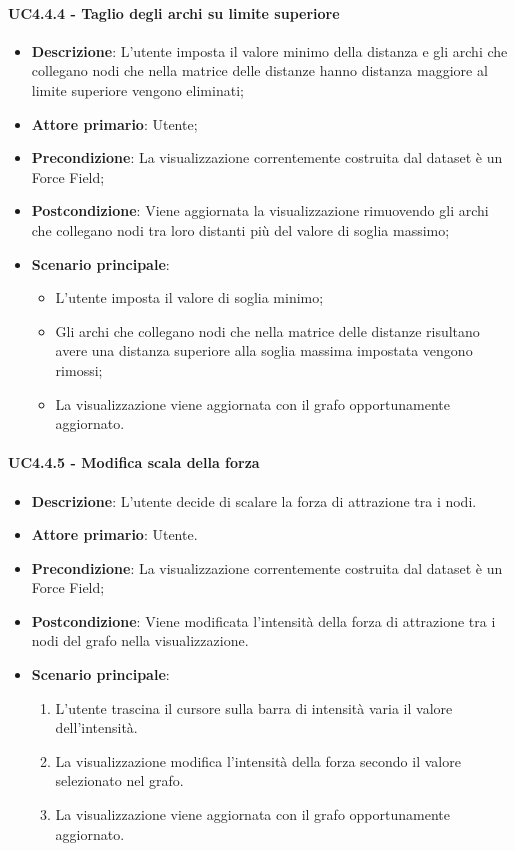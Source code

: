 \paragraph{UC4.4.4 - Taglio degli archi su limite superiore}
\label{par:uc4.4.4}
\begin{itemize}
    \item \textbf{Descrizione}:     L'utente imposta il valore minimo della distanza e gli archi che collegano nodi che nella matrice delle distanze hanno distanza maggiore al limite superiore vengono eliminati;
    \item \textbf{Attore primario}: Utente;
    \item \textbf{Precondizione}:   La visualizzazione correntemente costruita dal dataset è un Force Field;
    \item \textbf{Postcondizione}:  Viene aggiornata la visualizzazione rimuovendo gli archi  che collegano nodi tra loro distanti più del valore di soglia massimo;
    \item \textbf{Scenario principale}:
    \begin{itemize}
        \item L'utente imposta il valore di soglia minimo;
        \item Gli archi che collegano nodi che nella matrice delle distanze risultano avere una distanza superiore alla soglia massima impostata vengono rimossi;
        \item La visualizzazione viene aggiornata con il grafo opportunamente aggiornato.
    \end{itemize}
\end{itemize}

\paragraph{UC4.4.5 - Modifica scala della forza}
\label{par:uc4.4.5}
\begin{itemize}
    \item \textbf{Descrizione}: L’utente decide di scalare la forza di attrazione tra i nodi.


    \item \textbf{Attore primario}: Utente.

    \item \textbf{Precondizione}:   La visualizzazione correntemente costruita dal dataset è un Force Field;
    \item \textbf{Postcondizione}:  Viene modificata l'intensità della forza di attrazione tra i nodi del grafo nella visualizzazione.

	\item \textbf{Scenario principale}:
        \begin{enumerate}
            \item L'utente trascina il cursore sulla barra di intensità varia il valore dell’intensità.
            \item La visualizzazione modifica l'intensità della forza secondo il valore selezionato nel grafo.
            \item La visualizzazione viene aggiornata con il grafo opportunamente aggiornato.
        \end{enumerate}
\end{itemize}

